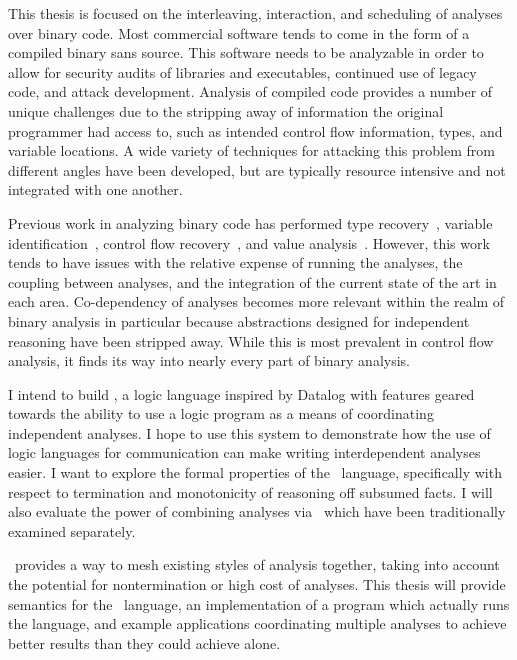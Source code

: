 This thesis is focused on the interleaving, interaction, and scheduling of analyses over binary code.
Most commercial software tends to come in the form of a compiled binary sans source.
This software needs to be analyzable in order to allow for security audits of libraries and executables, continued use of legacy code, and attack development.
Analysis of compiled code provides a number of unique challenges due to the stripping away of information the original programmer had access to, such as intended control flow information, types, and variable locations.
A wide variety of techniques for attacking this problem from different angles have been developed, but are typically resource intensive and not integrated with one another.

Previous work in analyzing binary code has performed type recovery~\cite{bitr}, variable identification~\cite{divine}, control flow recovery~\cite{jakstab,phoenix}, and value analysis~\cite{vsa}.
However, this work tends to have issues with the relative expense of running the analyses, the coupling between analyses, and the integration of the current state of the art in each area.
Co-dependency of analyses becomes more relevant within the realm of binary analysis in particular because abstractions designed for independent reasoning have been stripped away.
While this is most prevalent in control flow analysis, it finds its way into nearly every part of binary analysis.

I intend to build \sysname, a logic language inspired by Datalog with features geared towards the ability to use a logic program as a means of coordinating independent analyses.
I hope to use this system to demonstrate how the use of logic languages for communication can make writing interdependent analyses easier.
I want to explore the formal properties of the \sysname\ language, specifically with respect to termination and monotonicity of reasoning off subsumed facts.
I will also evaluate the power of combining analyses via \sysname\ which have been traditionally examined separately.

\sysname\ provides a way to mesh existing styles of analysis together, taking into account the potential for nontermination or high cost of analyses. This thesis will provide semantics for the \sysname\ language, an implementation of a program which actually runs the language, and example applications coordinating multiple analyses to achieve better results than they could achieve alone.
